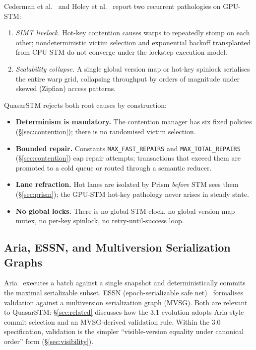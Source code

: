 Cederman et al.~\cite{cederman2010} and Holey et al.~\cite{holey2014}
report two recurrent pathologies on GPU-STM:
\begin{enumerate}[leftmargin=2em,nosep]
\item \emph{SIMT livelock.} Hot-key contention causes warps to
      repeatedly stomp on each other; nondeterministic victim
      selection and exponential backoff transplanted from CPU STM
      do not converge under the lockstep execution model.
\item \emph{Scalability collapse.} A single global version map or
      hot-key spinlock serialises the entire warp grid, collapsing
      throughput by orders of magnitude under skewed (Zipfian)
      access patterns.
\end{enumerate}

QuasarSTM rejects both root causes by construction:
\begin{itemize}[leftmargin=2em]
\item \textbf{Determinism is mandatory.} The contention manager has
      six fixed policies (\S\ref{sec:contention}); there is no
      randomised victim selection.
\item \textbf{Bounded repair.} Constants \texttt{MAX\_FAST\_REPAIRS}
      and \texttt{MAX\_TOTAL\_REPAIRS} (\S\ref{sec:contention})
      cap repair attempts; transactions that exceed them are
      promoted to a cold queue or routed through a semantic reducer.
\item \textbf{Lane refraction.} Hot lanes are isolated by Prism
      \emph{before} STM sees them
      (\S\ref{sec:prism}); the GPU-STM hot-key pathology never
      arises in steady state.
\item \textbf{No global locks.} There is no global STM clock, no
      global version map mutex, no per-key spinlock, no
      retry-until-success loop.
\end{itemize}

\subsection{Aria, ESSN, and Multiversion Serialization Graphs}

Aria~\cite{lu2020aria} executes a batch against a single snapshot
and deterministically commits the maximal serializable subset. ESSN
(epoch-serializable safe net)~\cite{adya2000essn} formalises validation
against a multiversion serialization graph (MVSG). Both are
relevant to QuasarSTM: \S\ref{sec:related} discusses how the 3.1
evolution adopts Aria-style commit selection and an MVSG-derived
validation rule. Within the 3.0 specification, validation is the
simpler ``visible-version equality under canonical order'' form
(\S\ref{sec:visibility}).


